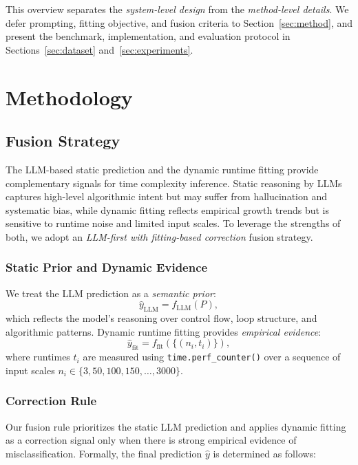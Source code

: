 \documentclass[conference]{IEEEtran}
\begin{document}
 This overview separates the \emph{system-level design} from the \emph{method-level details}. 
 We defer prompting, fitting objective, and fusion criteria to Section~\ref{sec:method}, and present the benchmark, 
 implementation, and evaluation protocol in Sections~\ref{sec:dataset} and~\ref{sec:experiments}.

\section{Methodology}
\label{sec:methodology}

\subsection{Fusion Strategy} 
 \label{subsec:fusion} 
 
 The LLM-based static prediction and the dynamic runtime fitting provide complementary signals for 
 time complexity inference. Static reasoning by LLMs captures high-level algorithmic intent but may 
 suffer from hallucination and systematic bias, while dynamic fitting reflects empirical growth trends 
 but is sensitive to runtime noise and limited input scales. To leverage the strengths of both, we adopt 
 an \emph{LLM-first with fitting-based correction} fusion strategy. 
 
 \subsubsection{Static Prior and Dynamic Evidence} 
 \label{subsubsec:prior_evidence} 
 
 We treat the LLM prediction as a \emph{semantic prior}: 
 \[ 
 \hat{y}_{\text{LLM}} = f_{\text{LLM}}(P), 
 \] 
 which reflects the model's reasoning over control flow, loop structure, and algorithmic patterns. 
 Dynamic runtime fitting provides \emph{empirical evidence}: 
 \[ 
 \hat{y}_{\text{fit}} = f_{\text{fit}}(\{(n_i, t_i)\}), 
 \] 
 where runtimes $t_i$ are measured using \texttt{time.perf\_counter()} over a sequence of input scales 
 $n_i \in \{3, 50, 100, 150, \dots, 3000\}$. 
 
 \subsubsection{Correction Rule} 
 \label{subsubsec:correction} 
 
 Our fusion rule prioritizes the static LLM prediction and applies dynamic fitting as a correction 
 signal only when there is strong empirical evidence of misclassification. Formally, the final prediction 
 $\hat{y}$ is determined as follows: 
 
\end{document}
